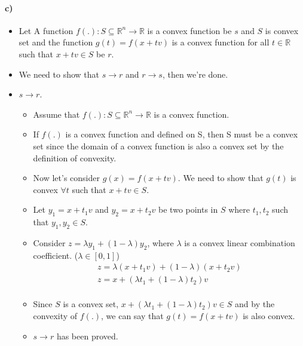 \documentclass[12pt]{article}
\begin{document}
\paragraph*{c)}
\begin{itemize}
            \item Let A function $f(.) : S \subseteq \mathbb{R}^n \rightarrow \mathbb{R}$ is a convex function be $s$ and $S$ is convex set and the function
            $g(t) = f (x + tv)$ is a convex function for all $t \in \mathbb{R}$ such that $x + tv \in S$ be $r$.
            \item We need to show that $s\rightarrow r$ and $r \rightarrow s$, then we're done.
            \item $s \rightarrow r$.
            \begin{itemize}
                \item Assume that  $f(.) : S \subseteq \mathbb{R}^n \rightarrow \mathbb{R}$ is a convex function.
                \item If $f(.)$ is a convex function and defined on S, then S must be a convex set since the domain of a convex function is also a convex set by the definition of convexity.
                \item Now let's consider $g(x) = f(x+tv)$. We need to show that $g(t)$ is convex $\forall t$ such that $x + tv \in S$.
                \item Let $y_1 = x + t_1v$ and $y_2 = x + t_2v$ be two points in $S$ where $t_1,t_2$ such that $y_1, y_2 \in S$.
                \item Consider $z = \lambda y_1 + (1 - \lambda)y_2$, where $\lambda$ is a convex linear combination coefficient. ($\lambda \in [0,1]$)
                \begin{equation*}
                    \begin{split}
                        z = \lambda (x + t_1v) + (1-\lambda)(x+t_2v)\\
                        z = x + (\lambda t_1 + (1-\lambda) t_2)v\\
                    \end{split}
                \end{equation*}
                \item Since $S$ is a convex set, $x + (\lambda t_1 + (1-\lambda) t_2)v \in S$ and by the convexity of $f(.)$, we can say that $g(t) = f(x + tv)$ is also convex.
                \item $s \rightarrow r$ has been proved.
            \end{itemize}

\end{itemize}
\end{document}
